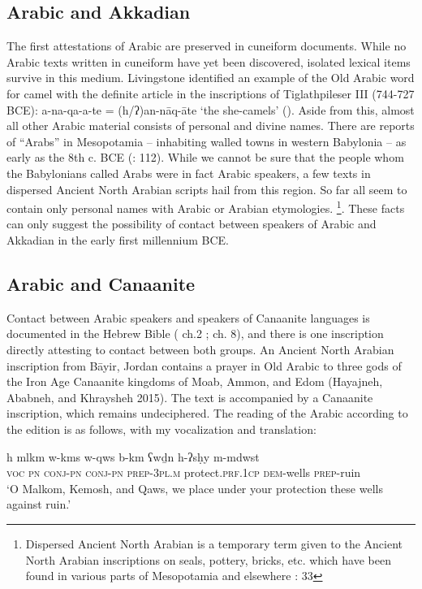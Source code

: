 \documentclass[output=paper]{langsci/langscibook}
\begin{document}
\subsection{Arabic and Akkadian}
The first attestations of Arabic are preserved in cuneiform documents. While no Arabic texts written in cuneiform have yet been discovered, isolated lexical items survive in this medium. Livingstone identified an example of the Old Arabic word for camel with the definite article in the inscriptions of Tiglathpileser III (744-727 BCE): a-na-qa-a-te = (h/ʔ)an-nāq-āte ‘the she-camels’ (\citealt{Livingstone1997}). Aside from this, almost all other Arabic material consists of personal and divine names. There are reports of “Arabs” in Mesopotamia – inhabiting walled towns in western Babylonia – as early as the 8th c. BCE (\citealt{Eph'al1974}: 112). While we cannot be sure that the people whom the Babylonians called Arabs were in fact Arabic speakers, a few texts in dispersed Ancient North Arabian scripts hail from this region. So far all seem to contain only personal names with Arabic or Arabian etymologies. \footnote{Dispersed Ancient North Arabian is a temporary term given to the Ancient North Arabian inscriptions on seals, pottery, bricks, etc. which have been found in various parts of Mesopotamia and elsewhere \citep{macdonald 2000}: 33}.  These facts can only suggest the possibility of contact between speakers of Arabic and Akkadian in the early first millennium BCE.

\subsection{Arabic and Canaanite}
Contact between Arabic speakers and speakers of Canaanite languages is documented in the Hebrew Bible (\citealt{Eph'al1982} ch.2 ;\citealt{Retsö2003} ch. 8), and there is one inscription directly attesting to contact between both groups. An Ancient North Arabian inscription from Bāyir, Jordan contains a prayer in Old Arabic to three gods of the Iron Age Canaanite kingdoms of Moab, Ammon, and Edom (Hayajneh, Ababneh, and Khraysheh 2015). The text is accompanied by a Canaanite inscription, which remains undeciphered. The reading of the Arabic according to the edition is as follows, with my vocalization and translation:

\ea

\gll h 	mlkm 	w-kms 	w-qws 	b-km 		   ʕwḏn h-ʔsḥy 		m-mdwst	\\
     \textsc{voc} \textsc{pn} \textsc{conj-pn} \textsc{conj-pn} \textsc{prep-3pl.m} protect.\textsc{prf.1cp} \textsc{dem}-wells \textsc{prep}-ruin \\
\glt ‘O Malkom, Kemosh, and Qaws, we place under your protection these wells against ruin.’
\z
\end{document}
